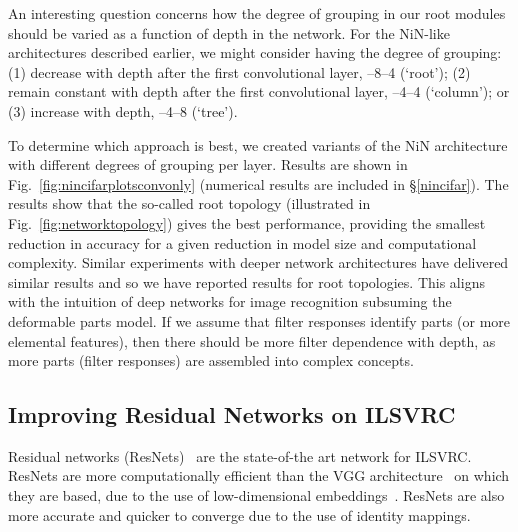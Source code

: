 \documentclass[thesis]{subfiles}
\begin{document}
	An interesting question concerns how the degree of grouping in our root modules should be varied as a function of depth in the network. For the NiN-like architectures described earlier, we might consider having the degree of grouping: (1) decrease with depth after the first convolutional layer, --8--4 (`root'); (2) remain constant with depth after the first convolutional layer, --4--4 (`column'); or (3) increase with depth, --4--8 (`tree').
	
	To determine which approach is best, we created variants of the NiN architecture with different degrees of grouping per layer. Results are shown in Fig.~\ref{fig:nincifarplotsconvonly} (numerical results are included in \S\ref{nincifar}). The results show that the so-called root topology (illustrated in Fig.~\ref{fig:networktopology}) gives the best performance, providing the smallest reduction in accuracy for a given reduction in model size and computational complexity. Similar experiments with deeper network architectures have delivered similar results and so we have reported results for root topologies. This aligns with the intuition of deep networks for image recognition subsuming the deformable parts model. If we assume that filter responses identify parts (or more elemental features), then there should be more filter dependence with depth, as more parts (filter responses) are assembled into complex concepts.
	
	\subsection{Improving Residual Networks on ILSVRC}
	Residual networks (ResNets)~\citep{He2015} are the state-of-the art network for ILSVRC. ResNets are more computationally efficient than the VGG architecture~\cite{Simonyan2014verydeep} on which they are based, due to the use of low-dimensional embeddings~\citep{Lin2013NiN}. ResNets are also more accurate and quicker to converge due to the use of identity mappings.
	
\end{document}
